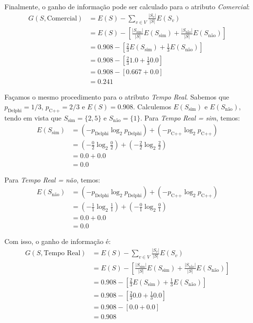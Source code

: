 Finalmente, o ganho de informação pode ser calculado para o atributo \textit{Comercial}:
\begin{align*}
	G(S, \text{Comercial}) &= E(S) - \sum_{v \in V} \frac{|S_v|}{|S|} E(S_v)\\[10pt]
	&= E(S) - \left[ \frac{|S_\text{sim}|}{|S|} E(S_\text{sim}) + \frac{|S_\text{não}|}{|S|} E(S_\text{não}) \right]\\[10pt]
	&= 0.908 - \left[ \frac{2}{3} E(S_\text{sim}) + \frac{1}{3} E(S_\text{não}) \right]\\[10pt]
	&= 0.908 - \left[ \frac{2}{3} 1.0 + \frac{1}{3} 0.0 \right]\\[10pt]
	&= 0.908 - \left[ 0.667 + 0.0 \right]\\[10pt]
	&= 0.241
\end{align*}

Façamos o mesmo procedimento para o atributo \textit{Tempo Real}. Sabemos que $p_\text{Delphi} = 1/3$, $p_\text{C++} = 2/3$ e $E(S) = 0.908$. Calculemos $E(S_\text{sim})$ e $E(S_\text{não})$, tendo em vista que $S_\text{sim} = \{2, 5\}$ e $S_\text{não} = \{1\}$. Para \textit{Tempo Real = sim}, temos:
\begin{align*}
	E(S_\text{sim}) &= (-p_\text{Delphi} \log_2 p_\text{Delphi}) + (-p_\text{C++} \log_2 p_\text{C++})\\[10pt]
	&= \left( - \frac{0}{2} \log_2 \frac{0}{2} \right) + \left( - \frac{2}{2} \log_2 \frac{2}{2} \right)\\[10pt]
	&= 0.0 + 0.0\\[10pt]
	&= 0.0
\end{align*}

Para \textit{Tempo Real = não}, temos:
\begin{align*}
	E(S_\text{não}) &= (-p_\text{Delphi} \log_2 p_\text{Delphi}) + (-p_\text{C++} \log_2 p_\text{C++})\\[10pt]
	&= \left( - \frac{1}{1} \log_2 \frac{1}{1} \right) + \left( - \frac{0}{1} \log_2 \frac{0}{1} \right)\\[10pt]
	&= 0.0 + 0.0\\[10pt]
	&= 0.0
\end{align*}

Com isso, o ganho de informação é:
\begin{align*}
	G(S, \text{Tempo Real}) &= E(S) - \sum_{v \in V} \frac{|S_v|}{|S|} E(S_v)\\[10pt]
	&= E(S) - \left[ \frac{|S_\text{sim}|}{|S|} E(S_\text{sim}) + \frac{|S_\text{não}|}{|S|} E(S_\text{não}) \right]\\[10pt]
	&= 0.908 - \left[ \frac{2}{3} E(S_\text{sim}) + \frac{1}{3} E(S_\text{não}) \right]\\[10pt]
	&= 0.908 - \left[ \frac{2}{3} 0.0 + \frac{1}{3} 0.0 \right]\\[10pt]
	&= 0.908 - \left[ 0.0 + 0.0 \right]\\[10pt]
	&= 0.908
\end{align*}

